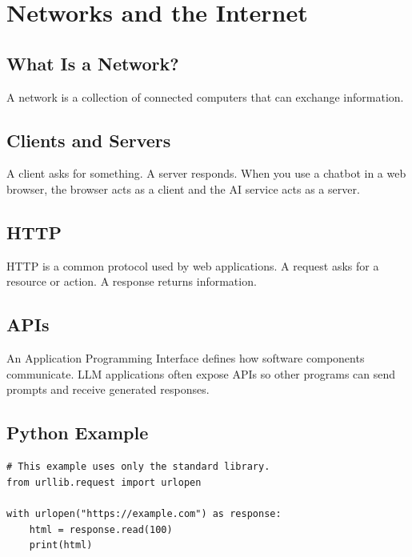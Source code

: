 
\chapter{Networks and the Internet}
\label{chap:networks-internet}


\section{What Is a Network?}
A network is a collection of connected computers that can exchange information.

\section{Clients and Servers}
A client asks for something. A server responds. When you use a chatbot in a web browser, the browser acts as a client and the AI service acts as a server.

\section{HTTP}
HTTP is a common protocol used by web applications. A request asks for a resource or action. A response returns information.

\section{APIs}
An Application Programming Interface defines how software components communicate. LLM applications often expose APIs so other programs can send prompts and receive generated responses.

\section{Python Example}
\begin{lstlisting}
# This example uses only the standard library.
from urllib.request import urlopen

with urlopen("https://example.com") as response:
    html = response.read(100)
    print(html)
\end{lstlisting}

